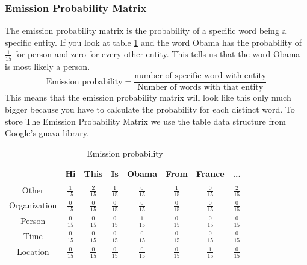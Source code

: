 \documentclass{article}
\begin{document}
\subsubsection{Emission Probability Matrix }
The emission probability matrix is the probability of a specific word being a specific entity. If you look at table \ref{tab:emissionProbability} and the word Obama has the probability of $\frac{1}{15}$ for person and zero for every other entity. This tells us that the word Obama is most likely a person.
\begin{equation}
\text{Emission probability} = \frac{\text{number of specific word with entity}}{\text{Number of words with that entity}}
\end{equation}
This means that the emission probability matrix will look like this only much bigger because you have to calculate the probability for each distinct word. To store The Emission Probability Matrix we use the table data structure from Google's guava library.
\begin{table}[here]
\centering
\begin{tabular}{|c|c|c|c|c|c|c|c|}
\hline
& Hi & This & Is & Obama & From & France & ...\\
\hline
Other & $\frac{1}{15}$ & $\frac{2}{15}$ & $\frac{1}{15}$ & $\frac{0}{15}$ & $\frac{1}{15}$ & $\frac{0}{15}$ & $\frac{2}{15}$\\
\hline
Organization & $\frac{0}{15}$ & $\frac{0}{15}$ & $\frac{0}{15}$ & $\frac{0}{15}$ & $\frac{0}{15}$ & $\frac{0}{15}$ & $\frac{0}{15}$\\
\hline
Person & $\frac{0}{15}$ & $\frac{0}{15}$ & $\frac{0}{15}$ & $\frac{1}{15}$ & $\frac{0}{15}$ & $\frac{0}{15}$ & $\frac{0}{15}$\\
\hline
Time & $\frac{0}{15}$ & $\frac{0}{15}$ & $\frac{0}{15}$ & $\frac{0}{15}$ & $\frac{0}{15}$ & $\frac{0}{15}$ & $\frac{0}{15}$\\
\hline
Location & $\frac{0}{15}$ & $\frac{0}{15}$ & $\frac{0}{15}$ & $\frac{0}{15}$ & $\frac{0}{15}$ & $\frac{1}{15}$ & $\frac{0}{15}$\\
\hline
\end{tabular}
\caption{Emission probability}
\label{tab:emissionProbability}
\end{table}
\end{document}
